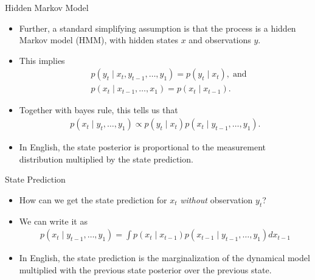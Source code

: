 \documentclass{beamer}
\begin{document}
\begin{frame}{Hidden Markov Model}
 \begin{itemize}
  \item Further, a standard simplifying assumption is that the process is a
        hidden Markov model (HMM), with hidden states $x$ and observations $y$.
  \item This implies
  \begin{align}
   &p(y_t \mid x_t,y_{t-1},\dotsc,y_1) = p(y_t \mid x_t), \; \text{and} \nonumber \\
   &p(x_t \mid x_{t-1},\dotsc,x_1) = p(x_t \mid x_{t-1}). \nonumber
  \end{align}
  \item Together with bayes rule, this tells us that
  \begin{align}
   p(x_t \mid y_t,\dotsc,y_1) \propto p(y_t \mid x_t) p(x_t \mid y_{t-1},\dotsc,y_1).
  \end{align}
  \item In English, the state posterior is proportional to the measurement distribution
        multiplied by the state prediction.
 \end{itemize}
\end{frame}

\begin{frame}{State Prediction}
 \begin{itemize}
  \item How can we get the state prediction for $x_t$ \textit{without}
        observation $y_t$?
  \item We can write it as
  \begin{align}
   p(x_t \mid y_{t-1},\dotsc,y_1) = \int p(x_t \mid x_{t-1}) p(x_{t-1} \mid y_{t-1},\dotsc,y_1) dx_{t-1} \nonumber
  \end{align}
  \item In English, the state prediction is the marginalization of the
        dynamical model multiplied with the previous state posterior over the
        previous state.
 \end{itemize}
\end{frame}
\end{document}
